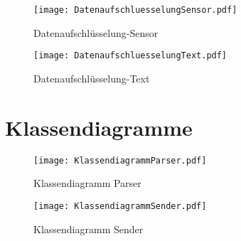 \begin{figure}[H]
	\centering
	\texttt{[image: DatenaufschluesselungSensor.pdf]}
	\caption{Datenaufschlüsselung-Sensor}
\end{figure}

\begin{figure}[H]
	\centering
	\texttt{[image: DatenaufschluesselungText.pdf]}
	\caption{Datenaufschlüsselung-Text}
\end{figure}

\section{Klassendiagramme}
\label{sec:klassendiagramme}

\begin{figure}[H]
\centering
\texttt{[image: KlassendiagrammParser.pdf]}
\caption{Klassendiagramm Parser}
\label{fig:KlassendiagrammParser}
\end{figure}

\newpage

\begin{figure}[H]
\centering
\texttt{[image: KlassendiagrammSender.pdf]}
\caption{Klassendiagramm Sender}
\label{fig:KlassendiagrammSender}
\end{figure}
